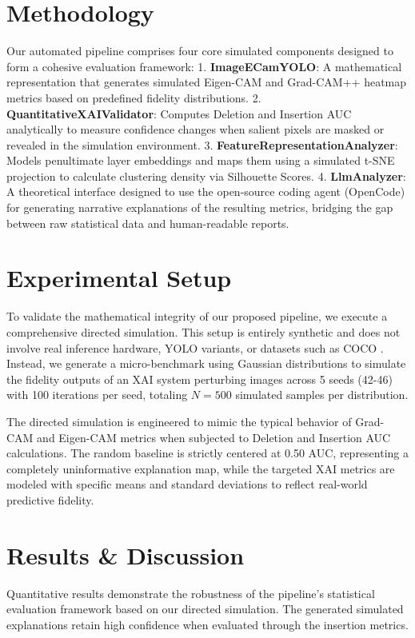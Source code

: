 \documentclass[conference]{IEEEtran}
\begin{document}
\section{Methodology}
Our automated pipeline comprises four core simulated components designed to form a cohesive evaluation framework:
1. \textbf{ImageECamYOLO}: A mathematical representation that generates simulated Eigen-CAM and Grad-CAM++ heatmap metrics based on predefined fidelity distributions.
2. \textbf{QuantitativeXAIValidator}: Computes Deletion and Insertion AUC analytically to measure confidence changes when salient pixels are masked or revealed in the simulation environment.
3. \textbf{FeatureRepresentationAnalyzer}: Models penultimate layer embeddings and maps them using a simulated t-SNE projection to calculate clustering density via Silhouette Scores.
4. \textbf{LlmAnalyzer}: A theoretical interface designed to use the open-source coding agent (OpenCode) for generating narrative explanations of the resulting metrics, bridging the gap between raw statistical data and human-readable reports.

\section{Experimental Setup}
To validate the mathematical integrity of our proposed pipeline, we execute a comprehensive directed simulation. This setup is entirely synthetic and does not involve real inference hardware, YOLO variants, or datasets such as COCO \cite{lin2014coco}. Instead, we generate a micro-benchmark using Gaussian distributions to simulate the fidelity outputs of an XAI system perturbing images across 5 seeds (42-46) with 100 iterations per seed, totaling $N = 500$ simulated samples per distribution.

The directed simulation is engineered to mimic the typical behavior of Grad-CAM and Eigen-CAM metrics when subjected to Deletion and Insertion AUC calculations. The random baseline is strictly centered at 0.50 AUC, representing a completely uninformative explanation map, while the targeted XAI metrics are modeled with specific means and standard deviations to reflect real-world predictive fidelity.

\section{Results \& Discussion}
Quantitative results demonstrate the robustness of the pipeline's statistical evaluation framework based on our directed simulation. The generated simulated explanations retain high confidence when evaluated through the insertion metrics.
\end{document}
